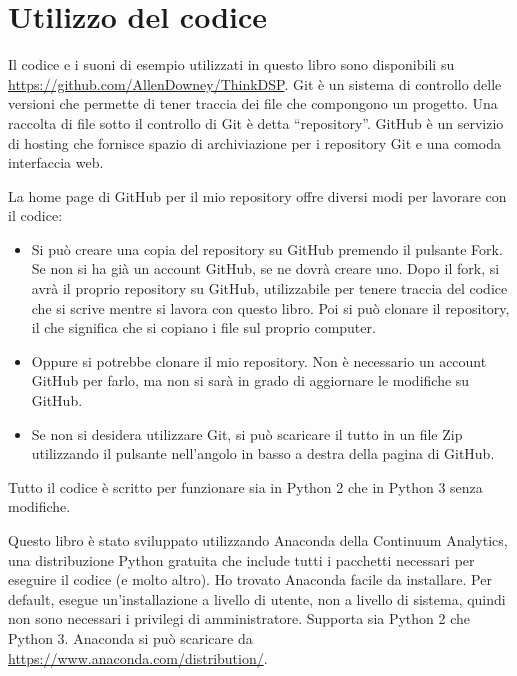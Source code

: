 \documentclass[12pt,a4paper]{book}
\begin{document}
\section{Utilizzo del codice} \label{code} 

Il codice e i suoni di esempio utilizzati in questo libro sono disponibili su \url{https://github.com/AllenDowney/ThinkDSP}. Git è un sistema di controllo delle versioni che permette di tener traccia dei file che compongono un progetto. Una raccolta di file sotto il controllo di Git è detta ``repository''. GitHub è un servizio di hosting che fornisce spazio di archiviazione per i repository Git e una comoda interfaccia web.    

La home page di GitHub per il mio repository offre diversi modi per lavorare con il codice:

\begin{itemize} 

\item Si può creare una copia del repository su GitHub premendo il pulsante {\sf Fork}. Se non si ha già un account GitHub, se ne dovrà creare uno. Dopo il fork, si avrà il proprio repository su GitHub, utilizzabile per tenere traccia del codice che si scrive mentre si lavora con questo libro. Poi si può clonare il repository, il che significa che si copiano i file sul proprio computer.  

\item Oppure si potrebbe clonare il mio repository. Non è necessario un account GitHub per farlo, ma non si sarà in grado di aggiornare le modifiche su GitHub.  

\item Se non si desidera utilizzare Git, si può scaricare il tutto in un file Zip utilizzando il pulsante nell'angolo in basso a destra della pagina di GitHub.

\end{itemize} 

Tutto il codice è scritto per funzionare sia in Python 2 che in Python 3 senza modifiche.

Questo libro è stato sviluppato utilizzando Anaconda della Continuum Analytics, una distribuzione Python gratuita che include tutti i pacchetti necessari per eseguire il codice (e molto altro). Ho trovato Anaconda facile da installare. Per default, esegue un'installazione a livello di utente, non a livello di sistema, quindi non sono necessari i privilegi di amministratore. Supporta sia Python 2 che Python 3. Anaconda si può scaricare da \url{https://www.anaconda.com/distribution/}.  
\end{document}

